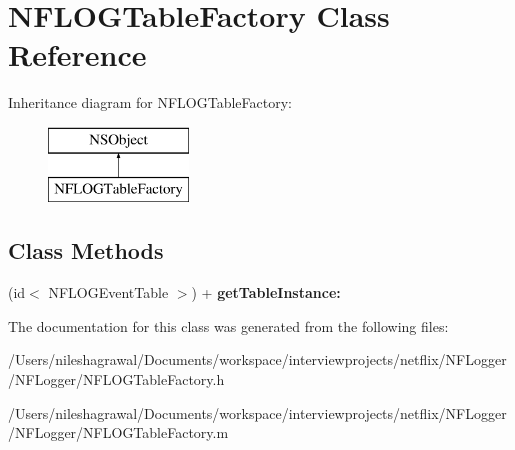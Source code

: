 \hypertarget{interface_n_f_l_o_g_table_factory}{}\section{N\+F\+L\+O\+G\+Table\+Factory Class Reference}
\label{interface_n_f_l_o_g_table_factory}
Inheritance diagram for N\+F\+L\+O\+G\+Table\+Factory\+:\begin{figure}[H]
\begin{center}
\leavevmode
\includegraphics[height=2.000000cm]{interface_n_f_l_o_g_table_factory}
\end{center}
\end{figure}
\subsection*{Class Methods}
\begin{DoxyCompactItemize}
\item 
\mbox{\label{interface_n_f_l_o_g_table_factory_a737a8c34cf9f404c726b341e260dc8b5}} 
(id$<$ N\+F\+L\+O\+G\+Event\+Table $>$) + {\bfseries get\+Table\+Instance\+:}
\end{DoxyCompactItemize}


The documentation for this class was generated from the following files\+:\begin{DoxyCompactItemize}
\item 
/\+Users/nileshagrawal/\+Documents/workspace/interviewprojects/netflix/\+N\+F\+Logger/\+N\+F\+Logger/N\+F\+L\+O\+G\+Table\+Factory.\+h\item 
/\+Users/nileshagrawal/\+Documents/workspace/interviewprojects/netflix/\+N\+F\+Logger/\+N\+F\+Logger/N\+F\+L\+O\+G\+Table\+Factory.\+m\end{DoxyCompactItemize}
